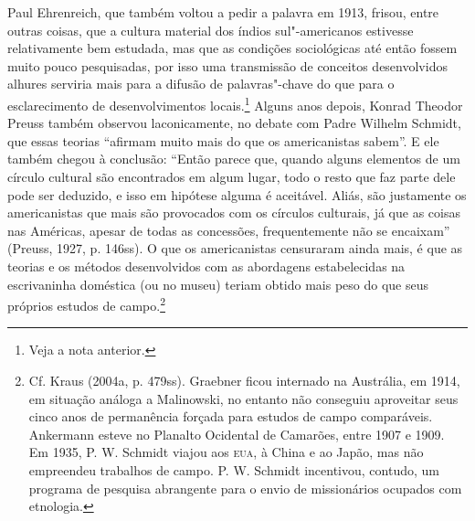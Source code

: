 Paul Ehrenreich, que também voltou a pedir a palavra em 1913, frisou,
entre outras coisas, que a cultura material dos índios sul"-americanos
estivesse relativamente bem estudada, mas que as condições sociológicas
até então fossem muito pouco pesquisadas, por isso uma transmissão de
conceitos desenvolvidos alhures serviria mais para a difusão de
palavras"-chave do que para o esclarecimento de desenvolvimentos
locais.\footnote{Veja a nota anterior.} Alguns anos depois, Konrad
Theodor Preuss também observou laconicamente, no debate com Padre
Wilhelm Schmidt, que essas teorias ``afirmam muito mais do que os
americanistas sabem''. E ele também chegou à conclusão: ``Então parece
que, quando alguns elementos de um círculo cultural são encontrados em
algum lugar, todo o resto que faz parte dele pode ser deduzido, e isso
em hipótese alguma é aceitável. Aliás, são justamente os americanistas
que mais são provocados com os círculos culturais, já que as coisas nas
Américas, apesar de todas as concessões, frequentemente não se
encaixam'' (Preuss, 1927, p. 146ss). O que os americanistas censuraram
ainda mais, é que as teorias e os métodos desenvolvidos com as
abordagens estabelecidas na escrivaninha doméstica (ou no museu) teriam
obtido mais peso do que seus próprios estudos de campo.\footnote{Cf.
  Kraus (2004a, p. 479ss). Graebner ficou internado na Austrália, em
  1914, em situação análoga a Malinowski, no entanto não conseguiu
  aproveitar seus cinco anos de permanência forçada para estudos de
  campo comparáveis. Ankermann esteve no Planalto Ocidental de Camarões,
  entre 1907 e 1909. Em 1935, P. W. Schmidt viajou aos \textsc{eua}, à China e ao
  Japão, mas não empreendeu trabalhos de campo. P. W. Schmidt
  incentivou, contudo, um programa de pesquisa abrangente para o envio
  de missionários ocupados com etnologia.}

